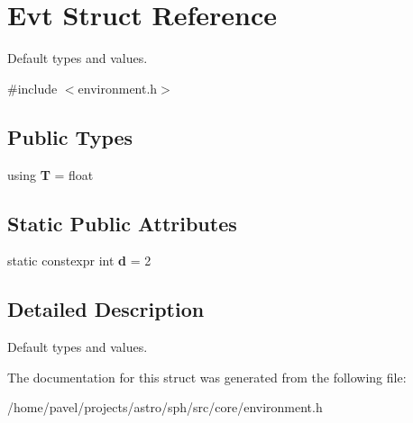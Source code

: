 \hypertarget{structEvt}{}\section{Evt Struct Reference}
\label{structEvt}


Default types and values.  




{\ttfamily \#include $<$environment.\+h$>$}

\subsection*{Public Types}
\begin{DoxyCompactItemize}
\item 
\hypertarget{structEvt_a3558ea52b8d91ccf33c0dbdd80cc6d3d}{}\label{structEvt_a3558ea52b8d91ccf33c0dbdd80cc6d3d} 
using {\bfseries T} = float
\end{DoxyCompactItemize}
\subsection*{Static Public Attributes}
\begin{DoxyCompactItemize}
\item 
\hypertarget{structEvt_adee725d3ba66078749277753a6d24daf}{}\label{structEvt_adee725d3ba66078749277753a6d24daf} 
static constexpr int {\bfseries d} = 2
\end{DoxyCompactItemize}


\subsection{Detailed Description}
Default types and values. 

The documentation for this struct was generated from the following file\+:\begin{DoxyCompactItemize}
\item 
/home/pavel/projects/astro/sph/src/core/environment.\+h\end{DoxyCompactItemize}
